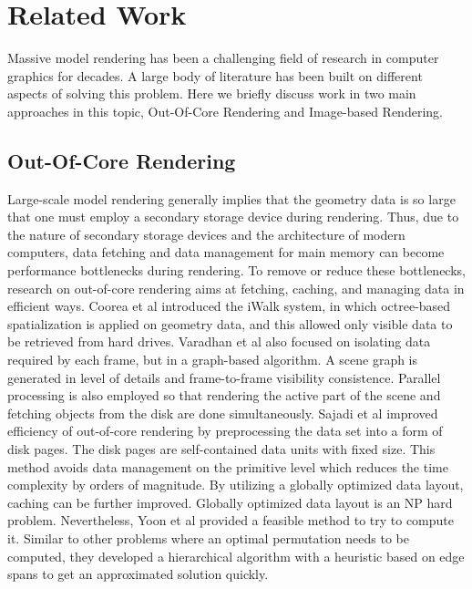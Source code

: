\documentclass[conference]{acmsiggraph}
\begin{document}
\section{Related Work}

Massive model rendering has been a challenging field of research in computer graphics for decades. A large body of literature has been built on different aspects of solving this problem. Here we briefly discuss work in two main approaches in this topic, Out-Of-Core Rendering and Image-based Rendering. 

\subsection{Out-Of-Core Rendering}

Large-scale model rendering generally implies that the geometry data is so large that one must employ a secondary storage device during rendering. Thus, due to the nature of secondary storage devices and the architecture of modern computers, data fetching and data management for main memory can become performance bottlenecks during rendering. To remove or reduce these bottlenecks, research on out-of-core rendering aims at fetching, caching, and managing data in efficient ways. Coorea et al \cite{iwalk} introduced the iWalk system, in which octree-based spatialization is applied on geometry data, and this allowed only visible data to be retrieved from hard drives. Varadhan et al \cite{outofcore} also focused on isolating data required by each frame, but in a graph-based algorithm. A scene graph is generated in level of details and frame-to-frame visibility consistence. Parallel processing is also employed so that rendering the active part of the scene and fetching objects from the disk are done simultaneously. Sajadi et al \cite{pagebased} improved efficiency of out-of-core rendering by preprocessing the data set into a form of disk pages. The disk pages are self-contained data units with fixed size. This method avoids data management on the primitive level which reduces the time complexity by orders of magnitude. By utilizing a globally optimized data layout, caching can be further improved. Globally optimized data layout is an NP hard problem. Nevertheless, Yoon et al \cite{cacheobliviouslayout} provided a feasible method to try to compute it. Similar to other problems where an optimal permutation needs to be computed, they developed a hierarchical algorithm with a heuristic based on edge spans to get an approximated solution quickly.
\end{document}
